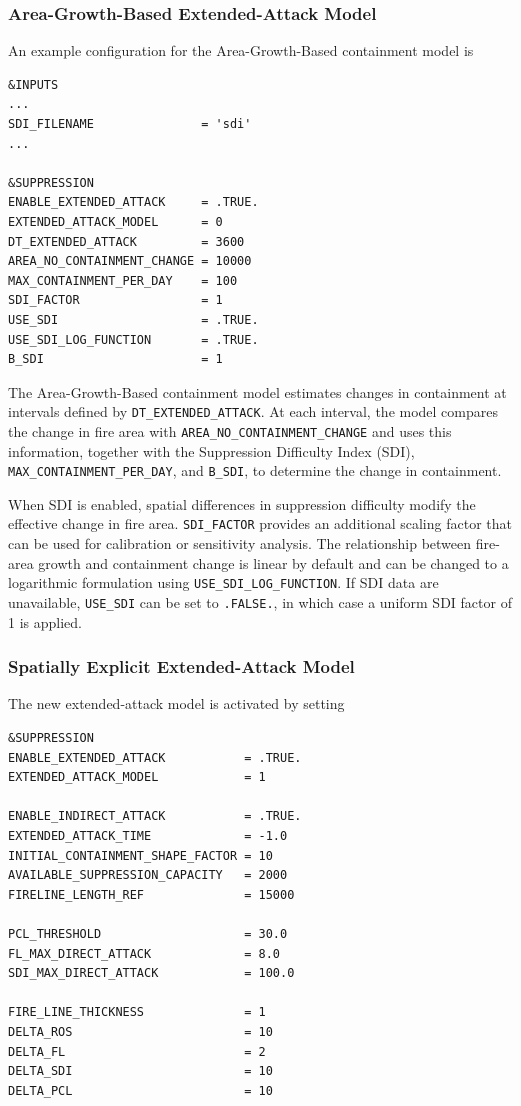 \subsubsection{Area-Growth-Based Extended-Attack Model}

An example configuration for the Area-Growth-Based containment model is

\begin{verbatim}
&INPUTS
...
SDI_FILENAME               = 'sdi'
...

&SUPPRESSION
ENABLE_EXTENDED_ATTACK     = .TRUE.
EXTENDED_ATTACK_MODEL      = 0
DT_EXTENDED_ATTACK         = 3600
AREA_NO_CONTAINMENT_CHANGE = 10000
MAX_CONTAINMENT_PER_DAY    = 100
SDI_FACTOR                 = 1
USE_SDI                    = .TRUE.
USE_SDI_LOG_FUNCTION       = .TRUE.
B_SDI                      = 1
\end{verbatim}

The Area-Growth-Based containment model estimates changes in containment at intervals defined by
\verb|DT_EXTENDED_ATTACK|. At each interval, the model compares the change in
fire area with \verb|AREA_NO_CONTAINMENT_CHANGE| and uses this information,
together with the Suppression Difficulty Index (SDI), 
\verb|MAX_CONTAINMENT_PER_DAY|, and \verb|B_SDI|, to determine the change in
containment.

When SDI is enabled, spatial differences in suppression difficulty modify the
effective change in fire area. \verb|SDI_FACTOR| provides an additional scaling
factor that can be used for calibration or sensitivity analysis. The relationship
between fire-area growth and containment change is linear by default and can be
changed to a logarithmic formulation using \verb|USE_SDI_LOG_FUNCTION|. If SDI
data are unavailable, \verb|USE_SDI| can be set to \verb|.FALSE.|, in which case
a uniform SDI factor of 1 is applied.

\subsubsection{Spatially Explicit Extended-Attack Model}

The new extended-attack model is activated by setting

\begin{verbatim}
&SUPPRESSION
ENABLE_EXTENDED_ATTACK           = .TRUE.
EXTENDED_ATTACK_MODEL            = 1

ENABLE_INDIRECT_ATTACK           = .TRUE.
EXTENDED_ATTACK_TIME             = -1.0
INITIAL_CONTAINMENT_SHAPE_FACTOR = 10
AVAILABLE_SUPPRESSION_CAPACITY   = 2000
FIRELINE_LENGTH_REF              = 15000

PCL_THRESHOLD                    = 30.0
FL_MAX_DIRECT_ATTACK             = 8.0
SDI_MAX_DIRECT_ATTACK            = 100.0

FIRE_LINE_THICKNESS              = 1
DELTA_ROS                        = 10
DELTA_FL                         = 2
DELTA_SDI                        = 10
DELTA_PCL                        = 10
\end{verbatim}


